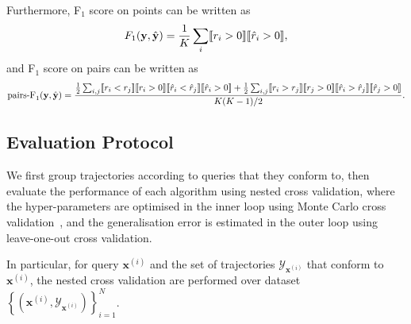 Furthermore, F$_1$ score on points can be written as
\begin{equation*}
F_1(\mathbf{y}, \hat{\mathbf{y}}) = \frac{1}{K} \sum_i \llbracket r_i > 0 \rrbracket  \llbracket \hat{r}_i > 0 \rrbracket,
\end{equation*}
and F$_1$ score on pairs can be written as
\begin{equation*}
\text{pairs-F}_1(\mathbf{y}, \hat{\mathbf{y}}) 
= \frac{\frac{1}{2} \sum_{i,j} 
  \llbracket r_i < r_j \rrbracket  \llbracket r_i > 0 \rrbracket  
  \llbracket \hat{r}_i < \hat{r}_j \rrbracket  \llbracket \hat{r}_i > 0 \rrbracket + 
  \frac{1}{2} \sum_{i,j} 
  \llbracket r_i > r_j \rrbracket  \llbracket r_j > 0 \rrbracket 
  \llbracket \hat{r}_i > \hat{r}_j \rrbracket  \llbracket \hat{r}_j > 0 \rrbracket}{K(K-1)/2}.
\end{equation*}



\subsection{Evaluation Protocol}
\label{sec:protocol}

We first group trajectories according to queries that they conform to,
then evaluate the performance of each algorithm using nested cross validation,
where the hyper-parameters are optimised in the inner loop using Monte Carlo cross validation~\cite{burman1989comparative},
and the generalisation error is estimated in the outer loop using leave-one-out cross validation.

In particular, for query $\mathbf{x}^{(i)}$ and the set of trajectories $\mathcal{Y}_{\mathbf{x}^{(i)}}$ that conform to $\mathbf{x}^{(i)}$,
the nested cross validation are performed over dataset $\left\{(\mathbf{x}^{(i)}, \mathcal{Y}_{\mathbf{x}^{(i)}})\right\}_{i=1}^N$.

